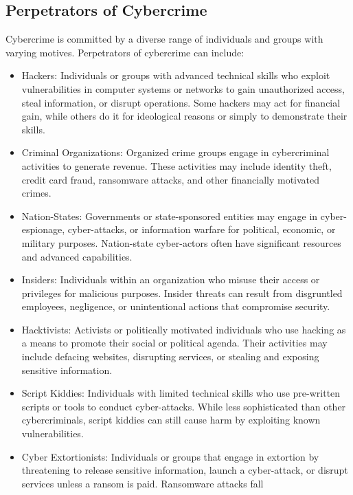 \documentclass[
  letterpaper,
  DIV=11,
  numbers=noendperiod]{scrreprt}
\providecommand{\tightlist}{%
  \setlength{\itemsep}{0pt}\setlength{\parskip}{0pt}}\usepackage{longtable,booktabs,array}
\begin{document}
\subsection{Perpetrators of
Cybercrime}\label{perpetrators-of-cybercrime}

Cybercrime is committed by a diverse range of individuals and groups
with varying motives. Perpetrators of cybercrime can include:

\begin{itemize}
\tightlist
\item
  Hackers: Individuals or groups with advanced technical skills who
  exploit vulnerabilities in computer systems or networks to gain
  unauthorized access, steal information, or disrupt operations. Some
  hackers may act for financial gain, while others do it for ideological
  reasons or simply to demonstrate their skills.
\item
  Criminal Organizations: Organized crime groups engage in cybercriminal
  activities to generate revenue. These activities may include identity
  theft, credit card fraud, ransomware attacks, and other financially
  motivated crimes.
\item
  Nation-States: Governments or state-sponsored entities may engage in
  cyber-espionage, cyber-attacks, or information warfare for political,
  economic, or military purposes. Nation-state cyber-actors often have
  significant resources and advanced capabilities.
\item
  Insiders: Individuals within an organization who misuse their access
  or privileges for malicious purposes. Insider threats can result from
  disgruntled employees, negligence, or unintentional actions that
  compromise security.
\item
  Hacktivists: Activists or politically motivated individuals who use
  hacking as a means to promote their social or political agenda. Their
  activities may include defacing websites, disrupting services, or
  stealing and exposing sensitive information.
\item
  Script Kiddies: Individuals with limited technical skills who use
  pre-written scripts or tools to conduct cyber-attacks. While less
  sophisticated than other cybercriminals, script kiddies can still
  cause harm by exploiting known vulnerabilities.
\item
  Cyber Extortionists: Individuals or groups that engage in extortion by
  threatening to release sensitive information, launch a cyber-attack,
  or disrupt services unless a ransom is paid. Ransomware attacks fall

\end{itemize}
\end{document}
